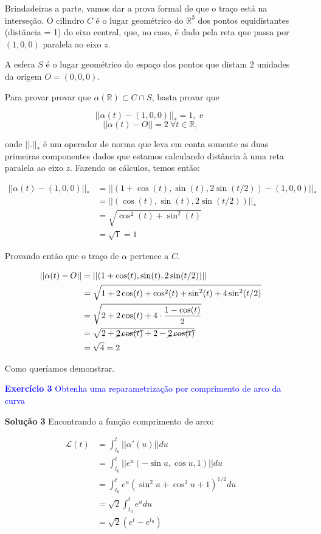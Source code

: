 \documentclass[12pt,letterpaper]{article}
\newcommand\lcur{\mathcal{L}}
\newcommand{\real}{\mathbb{R}}
\newcommand{\ex}[1]{\textcolor{blue}{\textbf{Exercício #1}}}
\newcommand{\sol}[1]{\textbf{Solução #1}}
\newcommand{\blue}[1]{{\color{blue}{#1}}}
\begin{document}
\begin{enumerate}
	Brindadeiras a parte, vamos dar a prova formal de que o traço está na interseção. O cilindro $C$ é o lugar geométrico do $\real^3$ dos pontos equidistantes (distância = 1) do eixo central, que, no caso, é dado pela reta que passa por $(1,0,0)$ paralela ao eixo $z$.
	
	A esfera $S$ é o lugar geométrico do espaço dos pontos que distam 2 unidades da origem $O=(0,0,0)$.
	
	Para provar provar que $\alpha(\real)\subset C\cap S$, basta provar que 
	
	$$||\alpha(t)-(1,0,0)||_*=1,\text{ e }$$
	$$||\alpha(t)-O||=2~\forall t \in \real,$$
	
	onde $||.||_*$ é um operador de norma que leva em conta somente as duas primeiras componentes dados que estamos calculando distância à uma reta paralela ao eixo $z$.
	Fazendo os cálculos, temos então:
	
	\begin{align*}
		||\alpha(t)-(1,0,0)||_*&=||(1 +\cos(t),\sin(t),2\sin(t/2))-(1,0,0)||_*\\
		&=||(\cos(t),\sin(t),2\sin(t/2))||_*\\
		&=\sqrt{\cos^2(t)+\sin^2(t)}\\
		&=\sqrt{1}=1
	\end{align*}
	
	Provando então que o traço de $\alpha$ pertence a $C$.
	
	\begin{align*}
		||\alpha(t)-O||&=||(1 +\cos(t),\sin(t),2\sin(t/2))||\\
		&=\sqrt{1+2\cos(t)+\cos^2(t)+\sin^2(t)+4\sin^2(t/2)}\\
		&=\sqrt{2+2\cos(t)+4\cdot\dfrac{1-\cos(t)}2}\\
		&=\sqrt{2+\cancel{2\cos(t)}+2-\cancel{2\cos(t)}}\\
		&=\sqrt{4}=2
	\end{align*}

	Como queríamos demonstrar.
	\item[\ex{3}] \textcolor{blue}{Obtenha uma reparametrização por comprimento de arco da curva }
	\blue{
	$$\alpha(t)=(e^t\cos(t),e^t\sin(t),e^t),~t\in\real$$}
	\item[\sol{3}] Encontrando a função comprimento de arco:
	
	\begin{align*}
		\lcur(t)&=\int_{t_0}^{t}||\alpha'(u)||du\\
		&=\int_{t_0}^{t}||e^u(-\sin u,\cos u,1)||du\\
		&=\int_{t_0}^{t}e^u(\sin^2u+\cos^2u+1)^{1/2}du\\
		&=\sqrt2\int_{t_0}^{t}e^udu\\
		&=\sqrt2(e^t-e^{t_0})
	\end{align*}
		

\end{enumerate}
\end{document}
